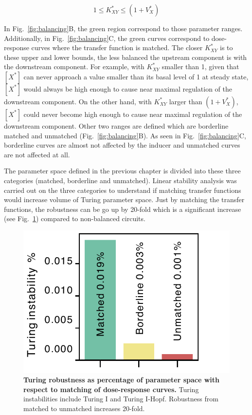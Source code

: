 \begin{equation}
    1 \leq K^*_{XY} \leq (1+V^*_{X})
\end{equation}

In Fig.~\ref{fig:balancing}B, the green region correspond to those parameter ranges.
Additionally, in Fig.~\ref{fig:balancing}C,
the green curves correspond to dose-response curves where the transfer function is matched.
The closer $K^*_{XY}$ is to these upper and lower bounds,
the less balanced the upstream component is with the downstream component.
For example, with $K^*_{XY}$ smaller than 1,
given that $[X^*]$ can never approach a value smaller than its basal level of 1 at steady state, $[X^*]$
would always be high enough to cause near maximal regulation of the downstream component.
On the other hand, with $K^*_{XY}$ larger than $(1+V^*_{X})$, $[X^*]$
could never become high enough to cause near maximal regulation of the downstream component.
Other two ranges are defined which are borderline matched and unmatched (Fig.~\ref{fig:balancing}B).
As seen in Fig.~\ref{fig:balancing}C,
borderline curves are almost not affected by the inducer and unmatched curves are not affected at all.

The parameter space defined in the previous chapter is divided into these three categories
(matched, borderline and unmatched).
Linear stability analysis was carried out on the three categories
to understand if matching transfer functions would increase volume of Turing parameter space.
Just by matching the transfer functions,
the robustness can be go up by 20-fold which is a significant increase
(see Fig.~\ref{fig:balancing_robustness}) compared to non-balanced circuits.


\begin{figure}[H]
    \centering
    \includegraphics[width=1\textwidth]{chapters/Chapter 2/balancing_robustness}
    \caption{\textbf{Turing robustness as percentage of parameter space with respect to matching of dose-response curves.} Turing instabilities include Turing I and Turing I-Hopf. Robustness from matched to unmatched increases 20-fold.}
    \label{fig:balancing_robustness}
\end{figure}

